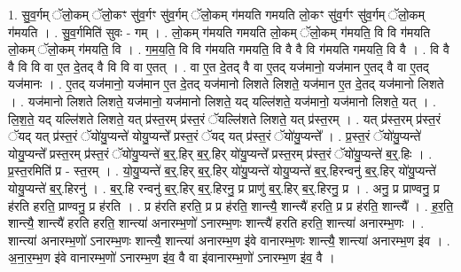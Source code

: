 \documentclass[17pt]{extarticle}
\begin{document}
1. सु॒व॒र्गम् ॅलो॒कम् ॅलो॒कꣳ सु॑व॒र्गꣳ सु॑व॒र्गम् ॅलो॒कम् ग॑मयति गमयति लो॒कꣳ सु॑व॒र्गꣳ सु॑व॒र्गम् ॅलो॒कम् ग॑मयति । . सु॒व॒र्गमिति॑ सुवः - गम् । . लो॒कम् ग॑मयति गमयति लो॒कम् ॅलो॒कम् ग॑मयति॒ वि वि ग॑मयति लो॒कम् ॅलो॒कम् ग॑मयति॒ वि । . ग॒म॒य॒ति॒ वि वि ग॑मयति गमयति॒ वि वै वै वि ग॑मयति गमयति॒ वि वै । . वि वै वै वि वि वा ए॒त दे॒तद् वै वि वि वा ए॒तत् । . वा ए॒त दे॒तद् वै वा ए॒तद् यज॑मानो॒ यज॑मान ए॒तद् वै वा ए॒तद् यज॑मानः । . ए॒तद् यज॑मानो॒ यज॑मान ए॒त दे॒तद् यज॑मानो लिशते लिशते॒ यज॑मान ए॒त दे॒तद् यज॑मानो लिशते । . यज॑मानो लिशते लिशते॒ यज॑मानो॒ यज॑मानो लिशते॒ यद् यल्लि॑शते॒ यज॑मानो॒ यज॑मानो लिशते॒ यत् । . लि॒श॒ते॒ यद् यल्लि॑शते लिशते॒ यत् प्र॑स्त॒रम् प्र॑स्त॒रं ॅयल्लि॑शते लिशते॒ यत् प्र॑स्त॒रम् । . यत् प्र॑स्त॒रम् प्र॑स्त॒रं ॅयद् यत् प्र॑स्त॒रं ॅयो॑यु॒प्यन्ते॑ योयु॒प्यन्ते᳚ प्रस्त॒रं ॅयद् यत् प्र॑स्त॒रं ॅयो॑यु॒प्यन्ते᳚ । . प्र॒स्त॒रं ॅयो॑यु॒प्यन्ते॑ योयु॒प्यन्ते᳚ प्रस्त॒रम् प्र॑स्त॒रं ॅयो॑यु॒प्यन्ते॑ ब॒र्॒.हिर् ब॒र्॒.हिर् यो॑यु॒प्यन्ते᳚ प्रस्त॒रम् प्र॑स्त॒रं ॅयो॑यु॒प्यन्ते॑ ब॒र्॒.हिः । . प्र॒स्त॒रमिति॑ प्र - स्त॒रम् । . यो॒यु॒प्यन्ते॑ ब॒र्॒.हिर् ब॒र्॒.हिर् यो॑यु॒प्यन्ते॑ योयु॒प्यन्ते॑ ब॒र्॒.हिरन्वनु॑ ब॒र्॒.हिर् यो॑यु॒प्यन्ते॑ योयु॒प्यन्ते॑ ब॒र्॒.हिरनु॑ । . ब॒र्॒.हि रन्वनु॑ ब॒र्॒.हिर् ब॒र्॒.हिरनु॒ प्र प्राणु॑ ब॒र्॒.हिर् ब॒र्॒.हिरनु॒ प्र । . अनु॒ प्र प्राण्वनु॒ प्र ह॑रति हरति॒ प्राण्वनु॒ प्र ह॑रति । . प्र ह॑रति हरति॒ प्र प्र ह॑रति॒ शान्त्यै॒ शान्त्यै॑ हरति॒ प्र प्र ह॑रति॒ शान्त्यै᳚ । . ह॒र॒ति॒ शान्त्यै॒ शान्त्यै॑ हरति हरति॒ शान्त्या॑ अनारम्भ॒णो॑ ऽनारम्भ॒णः शान्त्यै॑ हरति हरति॒ शान्त्या॑ अनारम्भ॒णः । . शान्त्या॑ अनारम्भ॒णो॑ ऽनारम्भ॒णः शान्त्यै॒ शान्त्या॑ अनारम्भ॒ण इ॑वे वानारम्भ॒णः शान्त्यै॒ शान्त्या॑ अनारम्भ॒ण इ॑व । . अ॒ना॒र॒म्भ॒ण इ॑वे वानारम्भ॒णो॑ ऽनारम्भ॒ण इ॑व॒ वै वा इ॑वानारम्भ॒णो॑ ऽनारम्भ॒ण इ॑व॒ वै । \newline
\end{document}
